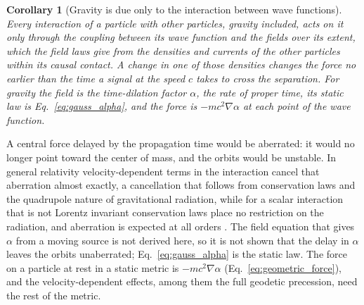 \documentclass[aps,prd,onecolumn,tightenlines,nofootinbib,notitlepage,11pt,floatfix]{revtex4-2}
\theoremstyle{indentedtheorem}
\newtheorem{corollary}{Corollary}
\begin{document}
\begin{corollary}[Gravity is due only to the interaction between wave functions]\label{cor:gravity}
Every interaction of a particle with other particles, gravity included, acts on it only through the coupling between its wave function and the fields over its extent, which the field laws give from the densities and currents of the other particles within its causal contact. A change in one of those densities changes the force no earlier than the time a signal at the speed $c$ takes to cross the separation. For gravity the field is the time-dilation factor $\alpha$, the rate of proper time, its static law is Eq.~\eqref{eq:gauss_alpha}, and the force is $-mc^2\nabla\alpha$ at each point of the wave function.
\end{corollary}

A central force delayed by the propagation time would be aberrated: it would no longer point toward the center of mass, and the orbits would be unstable. In general relativity velocity-dependent terms in the interaction cancel that aberration almost exactly, a cancellation that follows from conservation laws and the quadrupole nature of gravitational radiation, while for a scalar interaction that is not Lorentz invariant conservation laws place no restriction on the radiation, and aberration is expected at all orders \citep{Carlip2000Aberration}. The field equation that gives $\alpha$ from a moving source is not derived here, so it is not shown that the delay in $\alpha$ leaves the orbits unaberrated; Eq.~\eqref{eq:gauss_alpha} is the static law. The force on a particle at rest in a static metric is $-mc^2\nabla\alpha$ (Eq.~\eqref{eq:geometric_force}), and the velocity-dependent effects, among them the full geodetic precession, need the rest of the metric.
\end{document}

